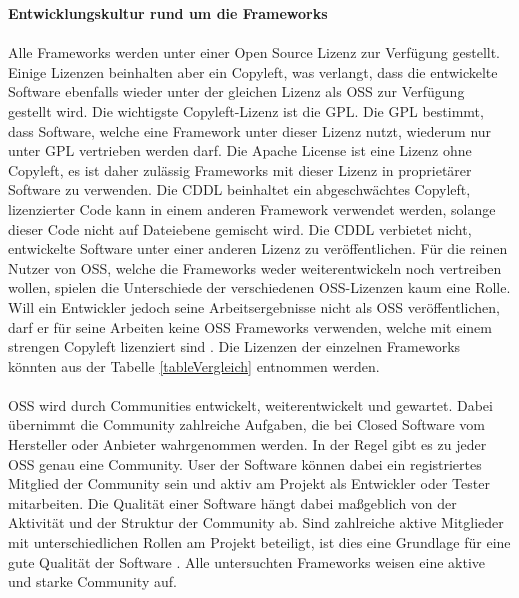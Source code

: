 {\large \textbf{Entwicklungskultur rund um die Frameworks}}\\\\
Alle Frameworks werden unter einer Open Source Lizenz zur Verfügung gestellt. Einige Lizenzen beinhalten aber ein Copyleft, was verlangt, dass die entwickelte Software ebenfalls wieder unter der gleichen Lizenz als \acrfull{OSS} zur Verfügung gestellt wird. Die wichtigste Copyleft-Lizenz ist die \acrfull{GPL}. Die GPL bestimmt, dass Software, welche eine Framework unter dieser Lizenz nutzt, wiederum nur unter GPL vertrieben werden darf. Die Apache License ist eine Lizenz ohne Copyleft, es ist daher zulässig Frameworks mit dieser Lizenz in proprietärer Software zu verwenden. Die \acrfull{CDDL} beinhaltet ein abgeschwächtes Copyleft, lizenzierter Code kann in einem anderen Framework verwendet werden, solange dieser Code nicht auf Dateiebene gemischt wird. Die CDDL verbietet nicht, entwickelte Software unter einer anderen Lizenz zu veröffentlichen. Für die reinen Nutzer von OSS, welche die Frameworks weder weiterentwickeln noch vertreiben wollen, spielen die Unterschiede der verschiedenen OSS-Lizenzen kaum eine Rolle. Will ein Entwickler jedoch seine Arbeitsergebnisse nicht als OSS veröffentlichen, darf er für seine Arbeiten keine OSS Frameworks verwenden, welche mit einem strengen Copyleft lizenziert sind \cite{openSource}. Die Lizenzen der einzelnen Frameworks könnten aus der Tabelle \ref{tableVergleich} entnommen werden.
\\\\
OSS wird durch Communities entwickelt, weiterentwickelt und gewartet. Dabei übernimmt die Community zahlreiche Aufgaben, die bei Closed Software vom Hersteller oder Anbieter wahrgenommen werden. In der Regel gibt es zu jeder OSS genau eine Community. User der Software können dabei ein registriertes Mitglied der Community sein und aktiv am Projekt als Entwickler oder Tester mitarbeiten. Die Qualität einer Software hängt dabei maßgeblich von der Aktivität und der Struktur der Community ab. Sind zahlreiche aktive Mitglieder mit unterschiedlichen Rollen am Projekt beteiligt, ist dies eine Grundlage für eine gute Qualität der Software \cite{openSource:community}. Alle untersuchten Frameworks weisen eine aktive und starke Community auf.
\\\\

